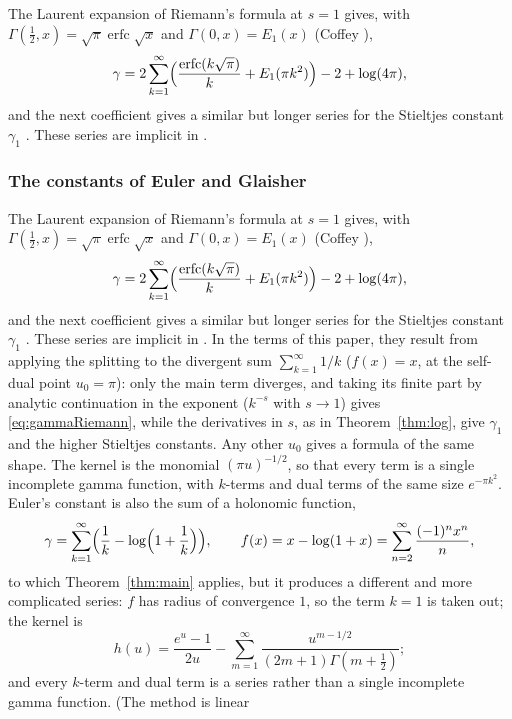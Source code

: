 \documentclass[11pt,reqno]{amsart}
\theoremstyle{definition}
\theoremstyle{remark}
\newcommand{\erfc}{\operatorname{erfc}}
\begin{document}
The Laurent expansion of Riemann's formula at $s = 1$ gives, with $\Gamma(\frac12, x) = \sqrt\pi\erfc\sqrt x$ and
$\Gamma(0, x) = E_1(x)$ (Coffey \cite[Proposition~9]{Cof14}),
\begin{equation}\label{eq:gammaRiemann}
  \gamma = 2\sum_{k=1}^{\infty}\Bigl(\frac{\erfc(k\sqrt\pi)}{k} + E_1(\pi k^2)\Bigr) - 2 + \log(4\pi),
\end{equation}
and the next coefficient gives a similar but longer series for the Stieltjes constant $\gamma_1$ \cite[(1.22)]{Cof14}.
These series are implicit in \cite{Rie59}.

\subsubsection{The constants of Euler and Glaisher}
The Laurent expansion of Riemann's formula at $s = 1$ gives, with $\Gamma(\frac12, x) = \sqrt\pi\erfc\sqrt x$ and
$\Gamma(0, x) = E_1(x)$ (Coffey \cite[Proposition~9]{Cof14}),
\begin{equation}\label{eq:gammaRiemann}
  \gamma = 2\sum_{k=1}^{\infty}\Bigl(\frac{\erfc(k\sqrt\pi)}{k} + E_1(\pi k^2)\Bigr) - 2 + \log(4\pi),
\end{equation}
and the next coefficient gives a similar but longer series for the Stieltjes constant $\gamma_1$ \cite[(1.22)]{Cof14}.
These series are implicit in \cite{Rie59}. In the terms of this paper, they result from applying the splitting
to the divergent sum $\sum_{k=1}^{\infty} 1/k$ ($f(x) = x$, at the self-dual point $u_0 = \pi$): only the main term diverges, and
taking its finite part by analytic continuation in the exponent ($k^{-s}$ with $s \to 1$) gives \eqref{eq:gammaRiemann},
while the derivatives in $s$, as in Theorem~\ref{thm:log}, give $\gamma_1$ and the higher Stieltjes constants. Any
other $u_0$ gives a formula of the same shape. The kernel is the monomial $(\pi u)^{-1/2}$, so that every term is a
single incomplete gamma function, with $k$-terms and dual terms of the same size $e^{-\pi k^2}$. Euler's constant is also the sum of a holonomic function,
\[
  \gamma = \sum_{k=1}^{\infty}\Bigl(\frac1k - \log\Bigl(1+\frac1k\Bigr)\Bigr), \qquad f(x) = x - \log(1+x) = \sum_{n=2}^{\infty}\frac{(-1)^nx^n}{n},
\]
to which Theorem~\ref{thm:main} applies, but it produces a different and more complicated series: $f$ has radius of
convergence $1$, so the term $k = 1$ is taken out; the kernel is
\[
  h(u) = \frac{e^u-1}{2u} - \sum_{m=1}^{\infty}\frac{u^{m-1/2}}{(2m+1)\Gamma(m+\frac12)};
\]
and every $k$-term and dual term is a series rather than a single incomplete gamma function. (The method is linear
\end{document}
